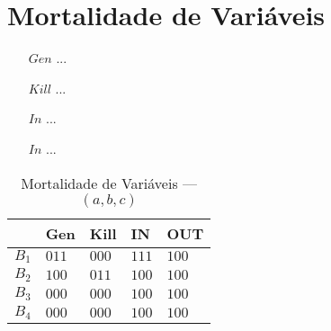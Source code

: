 \section{Mortalidade de Vari\'aveis}

\begin{itemize}
  \item[$Gen$] ...
  \item[$Kill$] ...
  \item[$In$] ...
  \item[$In$] ...
\end{itemize}

\begin{table}[ht]
\centering
\begin{tabular}{l|l|l|l|l}
	& Gen & Kill & IN & OUT\\
\hline
$B_{1}$ &  $011$ & $000$ & $111$ & $100$\\
$B_{2}$ &  $100$ & $011$ & $100$ & $100$\\
$B_{3}$ &  $000$ & $000$ & $100$ & $100$\\
$B_{4}$ &  $000$ & $000$ & $100$ & $100$\\
\end{tabular}
\caption{Mortalidade de Vari\'aveis --- $(a, b, c)$}
\end{table}

